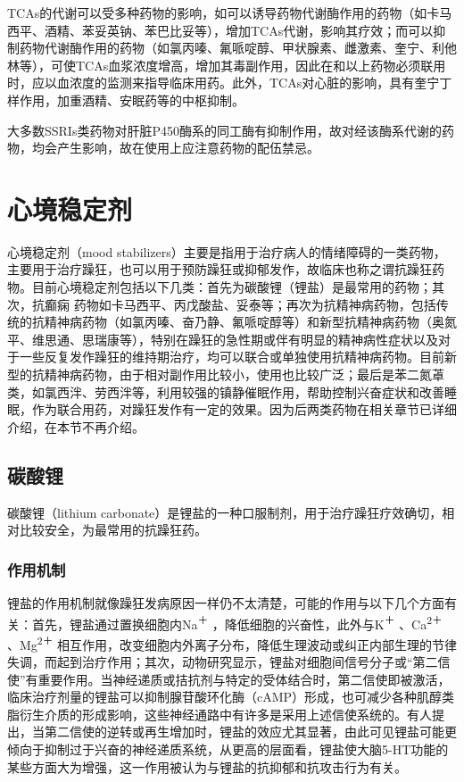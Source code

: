 TCAs的代谢可以受多种药物的影响，如可以诱导药物代谢酶作用的药物（如卡马西平、酒精、苯妥英钠、苯巴比妥等），增加TCAs代谢，影响其疗效；而可以抑制药物代谢酶作用的药物（如氯丙嗪、氟哌啶醇、甲状腺素、雌激素、奎宁、利他林等），可使TCAs血浆浓度增高，增加其毒副作用，因此在和以上药物必须联用时，应以血浓度的监测来指导临床用药。此外，TCAs对心脏的影响，具有奎宁丁样作用，加重酒精、安眠药等的中枢抑制。

大多数SSRIs类药物对肝脏P450酶系的同工酶有抑制作用，故对经该酶系代谢的药物，均会产生影响，故在使用上应注意药物的配伍禁忌。



\section{心境稳定剂}

心境稳定剂（mood
stabilizers）主要是指用于治疗病人的情绪障碍的一类药物，主要用于治疗躁狂，也可以用于预防躁狂或抑郁发作，故临床也称之谓抗躁狂药物。目前心境稳定剂包括以下几类：首先为碳酸锂（锂盐）是最常用的药物；其次，抗癫痫
药物如卡马西平、丙戊酸盐、妥泰等；再次为抗精神病药物，包括传统的抗精神病药物（如氯丙嗪、奋乃静、氟哌啶醇等）和新型抗精神病药物（奥氮平、维思通、思瑞康等），特别在躁狂的急性期或伴有明显的精神病性症状以及对于一些反复发作躁狂的维持期治疗，均可以联合或单独使用抗精神病药物。目前新型的抗精神病药物，由于相对副作用比较小，使用也比较广泛；最后是苯二氮䓬
类，如氯西泮、劳西泮等，利用较强的镇静催眠作用，帮助控制兴奋症状和改善睡眠，作为联合用药，对躁狂发作有一定的效果。因为后两类药物在相关章节已详细介绍，在本节不再介绍。

\subsection{碳酸锂}

碳酸锂（lithium
carbonate）是锂盐的一种口服制剂，用于治疗躁狂疗效确切，相对比较安全，为最常用的抗躁狂药。

\subsubsection{作用机制}

锂盐的作用机制就像躁狂发病原因一样仍不太清楚，可能的作用与以下几个方面有关：首先，锂盐通过置换细胞内Na\textsuperscript{＋}
，降低细胞的兴奋性，此外与K\textsuperscript{＋}
、Ca\textsuperscript{2＋} 、Mg\textsuperscript{2＋}
相互作用，改变细胞内外离子分布，降低生理波动或纠正内部生理的节律失调，而起到治疗作用；其次，动物研究显示，锂盐对细胞间信号分子或“第二信使”有重要作用。当神经递质或拮抗剂与特定的受体结合时，第二信使即被激活，临床治疗剂量的锂盐可以抑制腺苷酸环化酶（cAMP）形成，也可减少各种肌醇类脂衍生介质的形成影响，这些神经通路中有许多是采用上述信使系统的。有人提出，当第二信使的逆转或再生增加时，锂盐的效应尤其显著，由此可见锂盐可能更倾向于抑制过于兴奋的神经递质系统，从更高的层面看，锂盐使大脑5-HT功能的某些方面大为增强，这一作用被认为与锂盐的抗抑郁和抗攻击行为有关。

